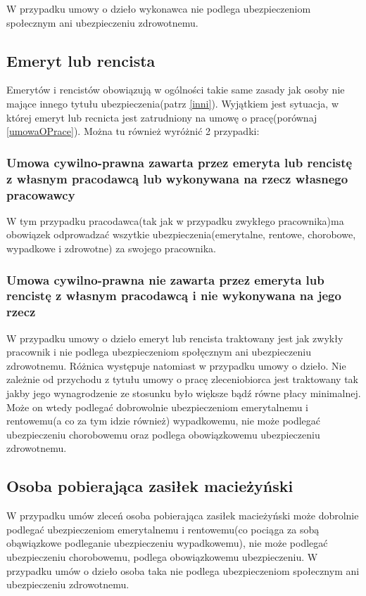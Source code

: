 W przypadku umowy o dzieło wykonawca nie podlega ubezpieczeniom społecznym ani ubezpieczeniu zdrowotnemu.

\subsection[Emeryt lub rencista][Emeryt lub rencista]{Emeryt lub rencista}
Emerytów i rencistów obowiązują w ogólności takie same zasady jak osoby nie mające innego tytułu ubezpieczenia(patrz \ref{inni}).
Wyjątkiem jest sytuacja, w której emeryt lub recnicta jest zatrudniony na umowę o pracę(porównaj \ref{umowaOPrace}). Można tu również wyróżnić 2 przypadki:

\subsubsection{Umowa cywilno-prawna zawarta przez emeryta lub rencistę z własnym pracodawcą lub wykonywana na rzecz własnego pracowawcy}
W tym przypadku pracodawca(tak jak w przypadku zwykłego pracownika)ma obowiązek odprowadzać wszytkie ubezpieczenia(emerytalne, rentowe, chorobowe, wypadkowe i zdrowotne) za swojego pracownika.

\subsubsection{Umowa cywilno-prawna nie zawarta przez emeryta lub rencistę z własnym pracodawcą i nie wykonywana na jego rzecz}
W przypadku umowy o dzieło emeryt lub rencista traktowany jest jak zwykły pracownik i nie podlega ubezpieczeniom społęcznym ani ubezpieczeniu zdrowotnemu. Różnica występuje natomiast w przypadku umowy o dzieło. Nie zależnie od przychodu z tytułu umowy o pracę zleceniobiorca jest traktowany tak jakby jego wynagrodzenie ze stosunku było większe bądź równe płacy minimalnej. Może on wtedy podlegać dobrowolnie ubezpieczeniom emerytalnemu i rentowemu(a co za tym idzie również) wypadkowemu, nie może podlegać ubezpieczeniu chorobowemu oraz podlega obowiązkowemu ubezpieczeniu zdrowotnemu.

\subsection{Osoba pobierająca zasiłek macieżyński}
W przypadku umów zleceń osoba pobierająca zasiłek macieżyński może dobrolnie podlegać ubezpieczeniom emerytalnemu i rentowemu(co pociąga za sobą obąwiązkowe podleganie ubezpieczeniu wypadkowemu), nie może podlegać ubezpieczeniu chorobowemu, podlega obowiązkowemu ubezpieczeniu. W przypadku umów o dzieło osoba taka nie podlega ubezpieczeniom społecznym ani ubezpieczeniu zdrowotnemu.

